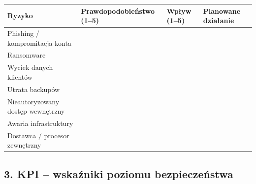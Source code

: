 \documentclass[12pt,a4paper]{article}
\begin{document}
\begin{longtable}[]{@{}>{\raggedright\arraybackslash}p{}>{\raggedright\arraybackslash}p{}>{\raggedright\arraybackslash}p{}>{\raggedright\arraybackslash}p{}@{}}
\toprule\noalign{}
Ryzyko & Prawdopodobieństwo (1--5) & Wpływ (1--5) & Planowane
działanie \\
\midrule\noalign{}
\endhead
\bottomrule\noalign{}
\endlastfoot
Phishing / kompromitacja konta & \underline{\hspace{2cm}} & \underline{\hspace{2cm}} &
\underline{\hspace{3cm}} \\
Ransomware & \underline{\hspace{2cm}} & \underline{\hspace{2cm}} &
\underline{\hspace{3cm}} \\
Wyciek danych klientów & \underline{\hspace{2cm}} & \underline{\hspace{2cm}} &
\underline{\hspace{3cm}} \\
Utrata backupów & \underline{\hspace{2cm}} & \underline{\hspace{2cm}} &
\underline{\hspace{3cm}} \\
Nieautoryzowany dostęp wewnętrzny & \underline{\hspace{2cm}} & \underline{\hspace{2cm}} &
\underline{\hspace{3cm}} \\
Awaria infrastruktury & \underline{\hspace{2cm}} & \underline{\hspace{2cm}} &
\underline{\hspace{3cm}} \\
Dostawca / procesor zewnętrzny & \underline{\hspace{2cm}} & \underline{\hspace{2cm}} &
\underline{\hspace{3cm}} \\
\end{longtable}

\subsection{3. KPI -- wskaźniki poziomu
bezpieczeństwa}\label{kpi-wskaux17aniki-poziomu-bezpieczeux144stwa}
\end{document}
